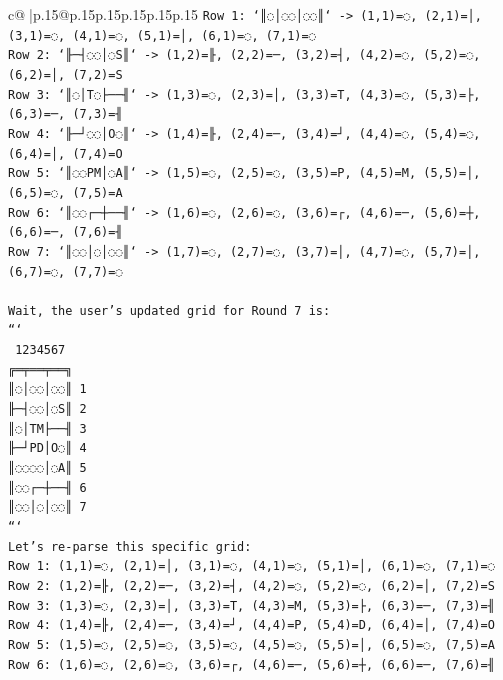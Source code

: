 \documentclass{article}
\begin{document}
{\begin{supertabular}{c@{$\;$}|p{.15\linewidth}@{}p{.15\linewidth}p{.15\linewidth}p{.15\linewidth}p{.15\linewidth}p{.15\linewidth}}
{{{\texttt{Row 1: `║◌│◌◌│◌◌║` {-}> (1,1)=◌, (2,1)=│, (3,1)=◌, (4,1)=◌, (5,1)=│, (6,1)=◌, (7,1)=◌} \\
\texttt{Row 2: `╟─┤◌◌│◌S║` {-}> (1,2)=╟, (2,2)=─, (3,2)=┤, (4,2)=◌, (5,2)=◌, (6,2)=│, (7,2)=S} \\
\texttt{Row 3: `║◌│T◌├──╢` {-}> (1,3)=◌, (2,3)=│, (3,3)=T, (4,3)=◌, (5,3)=├, (6,3)=─, (7,3)=╢} \\
\texttt{Row 4: `╟─┘◌◌│O◌║` {-}> (1,4)=╟, (2,4)=─, (3,4)=┘, (4,4)=◌, (5,4)=◌, (6,4)=│, (7,4)=O} \\
\texttt{Row 5: `║◌◌PM│◌A║` {-}> (1,5)=◌, (2,5)=◌, (3,5)=P, (4,5)=M, (5,5)=│, (6,5)=◌, (7,5)=A} \\
\texttt{Row 6: `║◌◌┌─┼──╢` {-}> (1,6)=◌, (2,6)=◌, (3,6)=┌, (4,6)=─, (5,6)=┼, (6,6)=─, (7,6)=╢} \\
\texttt{Row 7: `║◌◌│◌│◌◌║` {-}> (1,7)=◌, (2,7)=◌, (3,7)=│, (4,7)=◌, (5,7)=│, (6,7)=◌, (7,7)=◌} \\
\\ 
\texttt{Wait, the user's updated grid for Round 7 is:} \\
\texttt{```} \\
\texttt{ 1234567} \\
\texttt{╔═╤══╤══╗} \\
\texttt{║◌│◌◌│◌◌║ 1} \\
\texttt{╟─┤◌◌│◌S║ 2} \\
\texttt{║◌│TM├──╢ 3} \\
\texttt{╟─┘PD│O◌║ 4} \\
\texttt{║◌◌◌◌│◌A║ 5} \\
\texttt{║◌◌┌─┼──╢ 6} \\
\texttt{║◌◌│◌│◌◌║ 7} \\
\texttt{```} \\
\texttt{Let's re{-}parse this specific grid:} \\
\texttt{Row 1: (1,1)=◌, (2,1)=│, (3,1)=◌, (4,1)=◌, (5,1)=│, (6,1)=◌, (7,1)=◌} \\
\texttt{Row 2: (1,2)=╟, (2,2)=─, (3,2)=┤, (4,2)=◌, (5,2)=◌, (6,2)=│, (7,2)=S} \\
\texttt{Row 3: (1,3)=◌, (2,3)=│, (3,3)=T, (4,3)=M, (5,3)=├, (6,3)=─, (7,3)=╢} \\
\texttt{Row 4: (1,4)=╟, (2,4)=─, (3,4)=┘, (4,4)=P, (5,4)=D, (6,4)=│, (7,4)=O} \\
\texttt{Row 5: (1,5)=◌, (2,5)=◌, (3,5)=◌, (4,5)=◌, (5,5)=│, (6,5)=◌, (7,5)=A} \\
\texttt{Row 6: (1,6)=◌, (2,6)=◌, (3,6)=┌, (4,6)=─, (5,6)=┼, (6,6)=─, (7,6)=╢} \\
}}}
\end{supertabular}}
\end{document}

